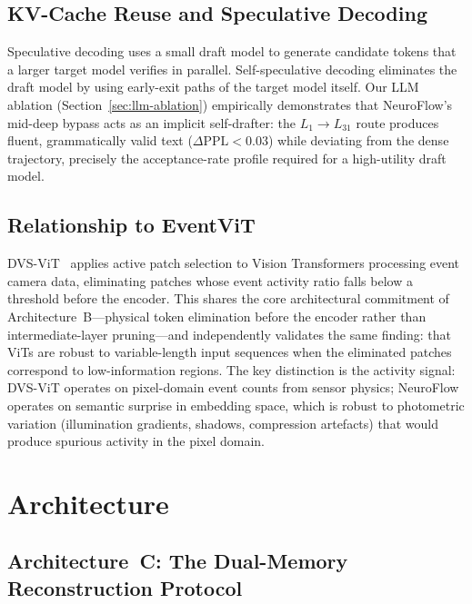 \documentclass{article}
\begin{document}
\subsection{KV-Cache Reuse and Speculative Decoding}
\label{rw:kvcache}

Speculative decoding \cite{leviathan2023speculative,chen2023speculative}
uses a small draft model to generate candidate tokens that a larger
target model verifies in parallel. Self-speculative decoding
\cite{elbayad2024layerskip} eliminates the draft model by using
early-exit paths of the target model itself. Our LLM ablation
(Section~\ref{sec:llm-ablation}) empirically demonstrates that
NeuroFlow's mid-deep bypass acts as an implicit self-drafter: the
$L_1{\to}L_{31}$ route produces fluent, grammatically valid text
($\Delta\mathrm{PPL} < 0.03$) while deviating from the dense
trajectory, precisely the acceptance-rate profile required for a
high-utility draft model.

\subsection*{Relationship to EventViT}

DVS-ViT~\cite{dvsvit2022} applies active patch selection to Vision
Transformers processing event camera data, eliminating patches whose
event activity ratio falls below a threshold before the encoder. This
shares the core architectural commitment of Architecture~B---physical
token elimination before the encoder rather than intermediate-layer
pruning---and independently validates the same finding: that ViTs are
robust to variable-length input sequences when the eliminated patches
correspond to low-information regions. The key distinction is the
activity signal: DVS-ViT operates on pixel-domain event counts from
sensor physics; NeuroFlow operates on semantic surprise in embedding
space, which is robust to photometric variation (illumination gradients,
shadows, compression artefacts) that would produce spurious activity in
the pixel domain.


\section{Architecture}\label{architecture}
\subsection{Architecture~C: The Dual-Memory Reconstruction Protocol}
\label{sec:arch-c-method}
\end{document}
